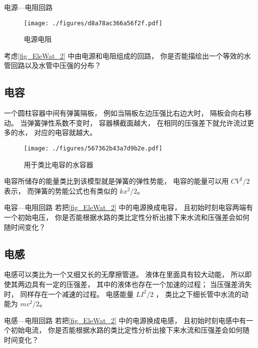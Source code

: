 \begin{exercise}{电源—电阻回路}
\begin{figure}[ht]
\centering
\texttt{[image: ./figures/d8a78ac366a56f2f.pdf]}
\caption{电源电阻} \label{fig_EleWat_2}
\end{figure}
考虑\autoref{fig_EleWat_2} 中由电源和电阻组成的回路， 你是否能描绘出一个等效的水管回路以及水管中压强的分布？
\end{exercise}

\subsection{电容}
一个圆柱容器中间有弹簧隔板， 例如当隔板左边压强比右边大时， 隔板会向右移动。 当弹簧弹性系数不变时， 容器横截面越大， 在相同的压强差下就允许流过更多的水， 对应的电容就越大。
\begin{figure}[ht]
\centering
\texttt{[image: ./figures/567362b43a7d9b2e.pdf]}
\caption{用于类比电容的水容器} \label{fig_EleWat_1}
\end{figure}

电容所储存的能量类比到该模型就是弹簧的弹性势能， 电容的能量可以用 $CV^2/2$ 表示， 而弹簧的势能公式也有类似的 $kx^2/2$。

\begin{exercise}{电容—电阻回路}\label{exe_EleWat_1}
若把\autoref{fig_EleWat_2} 中的电源换成电容， 且初始时刻电容两端有一个初始电压， 你是否能根据水路的类比定性分析出接下来水流和压强差会如何随时间变化？
\end{exercise}

\subsection{电感}
电感可以类比为一个又细又长的无摩擦管道。 液体在里面具有较大动能， 所以即使其两边具有一定的压强差， 其中的液体也存在一个加速的过程； 当压强差消失时， 同样存在一个减速的过程。 电感能量 $LI^2/2$ ， 类比之下细长管中水流的动能为 $mv^2/2$。

\begin{exercise}{电感—电阻回路}
若把\autoref{fig_EleWat_2} 中的电源换成电感， 且初始时刻电感中有一个初始电流， 你是否能根据水路的类比定性分析出接下来水流和压强差会如何随时间变化？
\end{exercise}
